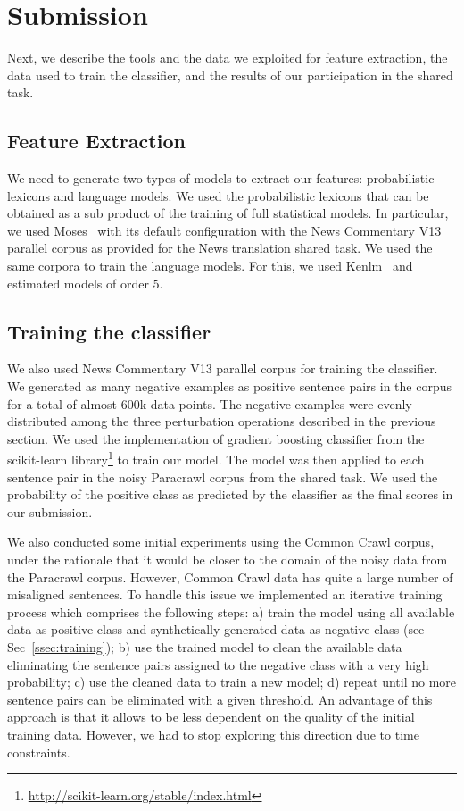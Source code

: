 \section{Submission}
\label{sec:results}

Next, we describe the tools and the data we exploited for feature extraction, the data used to train the classifier, and the results of our participation in the shared task.

\subsection{Feature Extraction}

We need to generate two types of models to extract our features: probabilistic lexicons and language models. We used the probabilistic lexicons that can be obtained as a sub product of the training of full statistical models. In particular, we used Moses~\cite{Moses} with its default configuration with the News Commentary V13 parallel corpus as provided for the News translation shared task. We used the same corpora to train the language models. For this, we used Kenlm~\cite{Kenlm} and estimated models of order $5$.


\subsection{Training the classifier}
\label{ssec:data}

We also used News Commentary V13 parallel corpus for training the classifier. We generated as many negative examples as positive sentence pairs in the corpus for a total of almost $600$k data points. The negative examples were evenly distributed among the three perturbation operations described in the previous section. We used the implementation of gradient boosting classifier from the scikit-learn library\footnote{\url{http://scikit-learn.org/stable/index.html}} to train our model. The model was then applied to each sentence pair in the noisy Paracrawl corpus from the shared task. We used the probability of the positive class as predicted by the classifier as the final scores in our submission.

We also conducted some initial experiments using the Common Crawl corpus, under the rationale that it would be closer to the domain of the noisy data from the Paracrawl corpus. However, Common Crawl data has quite a large number of misaligned sentences. To handle this issue we implemented an iterative training process which comprises the following steps: a) train the model using all available data as positive class and synthetically generated data as negative class (see Sec~\ref{ssec:training}); b) use the trained model to clean the available data eliminating the sentence pairs assigned to the negative class with a very high probability; c) use the cleaned data to train a new model; d) repeat until no more sentence pairs can be eliminated with a given threshold. An advantage of this approach is that it allows to be less dependent on the quality of the initial training data. However, we had to stop exploring this direction due to time constraints.

